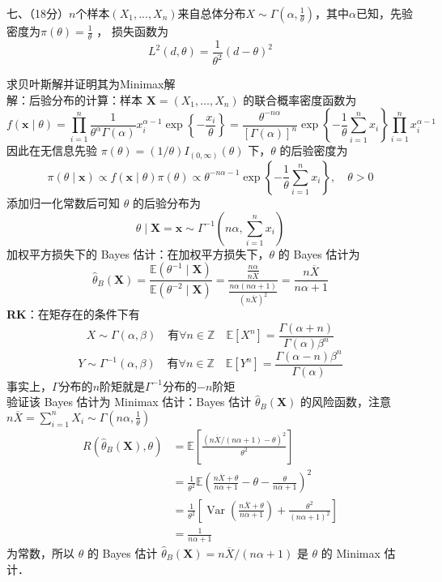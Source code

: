 \documentclass[UTF8,openany]{book}
\begin{document}
	\noindent 七、（18分）$n$个样本$(X_1,...,X_n)$来自总体分布$X\sim \Gamma\left(\alpha, \frac{1}{\theta}\right)$，其中$\alpha$已知，先验密度为$\pi(\theta) = \frac{1}{\theta} $ ，
	损失函数为 
	$$L^2(d,\theta) = \frac{1}{\theta^2}(d-\theta)^2$$
	
	求贝叶斯解并证明其为Minimax解\\
	解：后验分布的计算：样本 $\boldsymbol{X}=\left(X_1, \ldots, X_n\right)$ 的联合概率密度函数为
	$$
	f(\boldsymbol{x} \mid \theta)=\prod_{i=1}^n \frac{1}{\theta^\alpha \Gamma(\alpha)} x_i^{\alpha-1} \exp \left\{-\frac{x_i}{\theta}\right\}=\frac{\theta^{-n \alpha}}{[\Gamma(\alpha)]^n} \exp \left\{-\frac{1}{\theta} \sum_{i=1}^n x_i\right\} \prod_{i=1}^n x_i^{\alpha-1}
	$$
	因此在无信息先验 $\pi(\theta)=(1 / \theta) I_{(0, \infty)}(\theta)$ 下，$\theta$ 的后验密度为
	$$
	\pi(\theta \mid \boldsymbol{x}) \propto f(\boldsymbol{x} \mid \theta) \pi(\theta) \propto \theta^{-n \alpha-1} \exp \left\{-\frac{1}{\theta} \sum_{i=1}^n x_i\right\}, \quad \theta>0
	$$
	添加归一化常数后可知 $\theta$ 的后验分布为
	$$
	\theta \mid \boldsymbol{X}=\boldsymbol{x} \sim \Gamma^{-1}\left(n \alpha, \sum_{i=1}^n x_i\right)
	$$
	加权平方损失下的 Bayes 估计：在加权平方损失下，$\theta$ 的 Bayes 估计为
	$$
	\hat{\theta}_B(\boldsymbol{X})=\frac{\mathbb{E}\left(\theta^{-1} \mid \boldsymbol{X}\right)}{\mathbb{E}\left(\theta^{-2} \mid \boldsymbol{X}\right)}=\frac{\frac{n \alpha}{n \overline{X}}}{\frac{n \alpha(n \alpha+1)}{(n \overline{X})^2}}=\frac{n \overline{X}}{n \alpha+1}
	$$
	\textbf{RK}：在矩存在的条件下有\\
	\[
	X \sim \Gamma(\alpha,\beta) \quad \text{有} \forall n \in \mathbb{Z} \quad \mathbb{E}[X^n]=\frac{\Gamma(\alpha+n)}{\Gamma(\alpha)\beta^n}
	\]
	\[
	Y \sim \Gamma^{-1}(\alpha,\beta) \quad \text{有} \forall n \in \mathbb{Z} \quad \mathbb{E}[Y^n]=\frac{\Gamma(\alpha-n)\beta^n}{\Gamma(\alpha)}
	\]
	事实上，$\Gamma$分布的$n$阶矩就是$\Gamma^{-1}$分布的$-n$阶矩\\
	验证该 Bayes 估计为 Minimax 估计：Bayes 估计 $\hat{\theta}_B(\boldsymbol{X})$ 的风险函数，注意$n\overline{X}=\sum\limits_{i=1}^n X_i \sim \Gamma\left(n\alpha,\frac{1}{\theta} \right) $
	$$
	\begin{aligned}
		R\left(\hat{\theta}_B(\boldsymbol{X}), \theta\right) & =\mathbb{E}\left[\frac{(n \overline{X} /(n \alpha+1)-\theta)^2}{\theta^2}\right] \\
		& =\frac{1}{\theta^2} \mathbb{E}\left(\frac{n \overline{X}+\theta}{n \alpha+1}-\theta-\frac{\theta}{n \alpha+1}\right)^2 \\
		& =\frac{1}{\theta^2}\left[\operatorname{Var}\left(\frac{n \overline{X}+\theta}{n \alpha+1}\right)+\frac{\theta^2}{(n \alpha+1)^2}\right]\\
		&=\frac{1}{n \alpha+1}
	\end{aligned}
	$$
	为常数，所以 $\theta$ 的 Bayes 估计 $\hat{\theta}_B(\boldsymbol{X})=n \overline{X} /(n \alpha+1)$ 是 $\theta$ 的 Minimax 估计．\\
	
\end{document}
